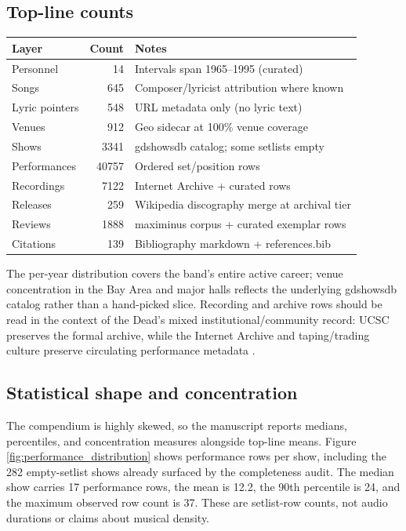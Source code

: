 \documentclass[
]{article}
\newcounter{none} %
\begin{document}
\subsection{Top-line counts}\label{top-line-counts}

{\def\LTcaptype{none} %
\begin{longtable}[]{@{}lrl@{}}
\toprule\noalign{}
Layer & Count & Notes \\
\midrule\noalign{}
\endhead
\bottomrule\noalign{}
\endlastfoot
Personnel & 14 & Intervals span 1965--1995 (curated) \\
Songs & 645 & Composer/lyricist attribution where known \\
Lyric pointers & 548 & URL metadata only (no lyric text) \\
Venues & 912 & Geo sidecar at 100\% venue coverage \\
Shows & 3341 & gdshowsdb catalog; some setlists empty \\
Performances & 40757 & Ordered set/position rows \\
Recordings & 7122 & Internet Archive + curated rows \\
Releases & 259 & Wikipedia discography merge at archival tier \\
Reviews & 1888 & maximinus corpus + curated exemplar rows \\
Citations & 139 & Bibliography markdown + references.bib \\
\end{longtable}
}

The per-year distribution covers the band's entire active career; venue
concentration in the Bay Area and major halls reflects the underlying
gdshowsdb catalog rather than a hand-picked slice. Recording and archive
rows should be read in the context of the Dead's mixed
institutional/community record: UCSC preserves the formal archive, while
the Internet Archive and taping/trading culture preserve circulating
performance metadata
\citep{ucsc_grateful_dead_archive, internet_archive_gd_collection_policy, dead_net_taping_dead, wallace_cocreation_sound_archive}.

\subsection{Statistical shape and
concentration}\label{statistical-shape-and-concentration}

The compendium is highly skewed, so the manuscript reports medians,
percentiles, and concentration measures alongside top-line means. Figure
\ref{fig:performance_distribution} shows performance rows per show,
including the 282 empty-setlist shows already surfaced by the
completeness audit. The median show carries 17 performance rows, the
mean is 12.2, the 90th percentile is 24, and the maximum observed row
count is 37. These are setlist-row counts, not audio durations or claims
about musical density.
\end{document}
